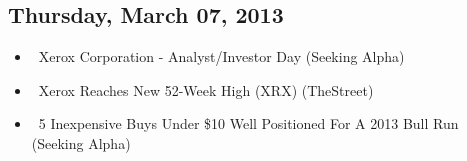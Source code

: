 \documentclass[11pt,asymmetric]{article}
\begin{document}
\subsection*{Thursday, March 07, 2013}
\begin{itemize}
\item\ Xerox Corporation - Analyst/Investor Day (Seeking Alpha)
\item\ Xerox Reaches New 52-Week High (XRX) (TheStreet)
\item\ 5 Inexpensive Buys Under \$10 Well Positioned For A 2013 Bull Run (Seeking Alpha)
\end{itemize}
\end{document}
